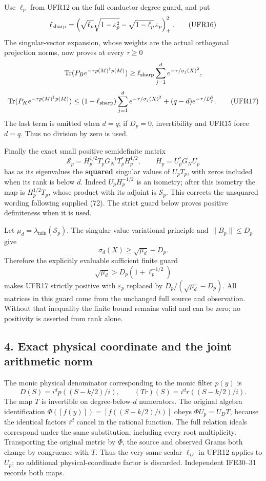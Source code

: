 \documentclass[11pt]{article}
\begin{document}
Use \(\ell_p\) from UFR12 on the full conductor degree guard, and put \[
\ell_{\rm sharp}=
\left(\sqrt{\ell_p}\sqrt{1-\varepsilon_p^2}
-\sqrt{1-\ell_p}\,\varepsilon_p\right)_+^2.
\tag{UFR16}
\] The singular-vector expansion, whose weights are the actual orthogonal projection norms, now proves at every \(\tau\ge0\) \[
\operatorname{Tr}(P_Be^{-\tau p(M)^\dagger p(M)})
 \ge\ell_{\rm sharp}\sum_{j=1}^d e^{-\tau/\sigma_j(X)^2},
\] \[
\operatorname{Tr}(P_Ke^{-\tau p(M)^\dagger p(M)})
 \le(1-\ell_{\rm sharp})\sum_{j=1}^d e^{-\tau/\sigma_j(X)^2}
 +(q-d)e^{-\tau/D_p^2}.                                        \tag{UFR17}
\] The last term is omitted when \(d=q\); if \(D_p=0\), invertibility and UFR15 force \(d=q\). Thus no division by zero is used.

Finally the exact small positive semidefinite matrix \[
\mathcal S_p=H_p^{1/2}T_pG_N^{-1}T_p^*H_p^{1/2},
\qquad H_p=U_p^*G_NU_p
\tag{UFR18}
\] has as its eigenvalues the \textbf{squared} singular values of \(U_pT_p\), with zeros included when its rank is below \(d\). Indeed \(U_pH_p^{-1/2}\) is an isometry; after this isometry the map is \(H_p^{1/2}T_p\), whose product with its adjoint is \(\mathcal S_p\). This corrects the unsquared wording following supplied (72). The strict guard below proves positive definiteness when it is used.

Let \(\mu_d=\lambda_{\min}(\mathcal S_p)\). The singular-value variational principle and \(\|B_p\|\le D_p\) give \[
\sigma_d(X)\ge\sqrt{\mu_d}-D_p.
\] Therefore the explicitly evaluable sufficient finite guard \[
\boxed{\sqrt{\mu_d}>D_p(1+\ell_p^{-1/2})}
\tag{UFR19}
\] makes UFR17 strictly positive with \(\varepsilon_p\) replaced by \(D_p/(\sqrt{\mu_d}-D_p)\). All matrices in this guard come from the unchanged full source and observation. Without that inequality the finite bound remains valid and can be zero; no positivity is asserted from rank alone.

\subsection{4. Exact physical coordinate and the joint arithmetic norm}\label{exact-physical-coordinate-and-the-joint-arithmetic-norm}

The monic physical denominator corresponding to the monic filter \(p(y)\) is \[
D(S)=i^d p((S-k/2)/i),\qquad
(T r)(S)=i^d r((S-k/2)/i).                              \tag{UFR20}
\] The map \(T\) is invertible on degree-below-\(d\) numerators. The original algebra identification \(\Phi([f(y)])=[f((S-k/2)/i)]\) obeys \(\Phi U_p=U_DT\), because the identical factors \(i^d\) cancel in the rational function. The full relation ideals correspond under the same substitution, including every root multiplicity. Transporting the original metric by \(\Phi\), the source and observed Grams both change by congruence with \(T\). Thus the very same scalar \(\ell_D\) in UFR12 applies to \(U_p\); no additional physical-coordinate factor is discarded. Independent IFE30--31 records both maps.
\end{document}
